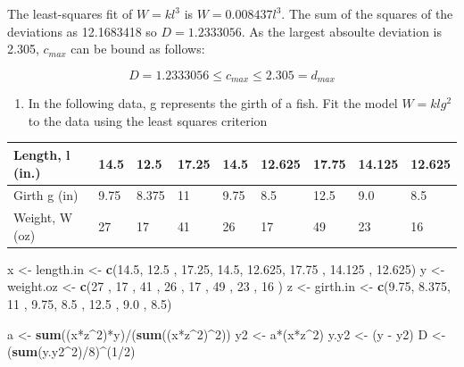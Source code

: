 \documentclass[]{article}
\newenvironment{Shaded}{\begin{snugshade}}{\end{snugshade}}
\newcommand{\KeywordTok}[1]{\textcolor[rgb]{0.13,0.29,0.53}{\textbf{{#1}}}}
\newcommand{\DecValTok}[1]{\textcolor[rgb]{0.00,0.00,0.81}{{#1}}}
\newcommand{\FloatTok}[1]{\textcolor[rgb]{0.00,0.00,0.81}{{#1}}}
\newcommand{\StringTok}[1]{\textcolor[rgb]{0.31,0.60,0.02}{{#1}}}
\newcommand{\NormalTok}[1]{{#1}}
\providecommand{\tightlist}{%
  \setlength{\itemsep}{0pt}\setlength{\parskip}{0pt}}
\begin{document}
The least-squares fit of \(W = kl^3\) is \(W = 0.008437l^3\). The sum of
the squares of the deviations as 12.1683418 so \(D = 1.2333056\). As the
largest absoulte deviation is 2.305, \(c_{max}\) can be bound as
follows:

\[D = 1.2333056 \leq c_{max} \leq 2.305 = d_{max}\]

\begin{enumerate}
\def\labelenumi{\alph{enumi}.}
\setcounter{enumi}{1}
\tightlist
\item
  In the following data, g represents the girth of a fish. Fit the model
  \(W = klg^2\) to the data using the least squares criterion
\end{enumerate}

\begin{table}[!htbp]
\centering
\label{my-label}
\begin{tabular}{l|llllllll}
Length, l (in.) & 14.5 & 12.5 & 17.25 & 14.5 & 12.625 & 17.75 & 14.125 & 12.625 \\ \hline
Girth g (in) & 9.75 & 8.375 & 11 & 9.75 & 8.5 & 12.5 & 9.0 & 8.5 \\ \hline
Weight, W (oz)  & 27   & 17   & 41    & 26   & 17     & 49    & 23     & 16  
\end{tabular}
\end{table}

\begin{Shaded}
\begin{Highlighting}[]
\NormalTok{x <-}\StringTok{ }\NormalTok{length.in <-}\StringTok{ }\KeywordTok{c}\NormalTok{(}\FloatTok{14.5}\NormalTok{, }\FloatTok{12.5} \NormalTok{, }\FloatTok{17.25}\NormalTok{, }\FloatTok{14.5}\NormalTok{, }\FloatTok{12.625}\NormalTok{, }\FloatTok{17.75} \NormalTok{, }\FloatTok{14.125} \NormalTok{, }\FloatTok{12.625}\NormalTok{)}
\NormalTok{y <-}\StringTok{ }\NormalTok{weight.oz <-}\StringTok{ }\KeywordTok{c}\NormalTok{(}\DecValTok{27}  \NormalTok{, }\DecValTok{17}   \NormalTok{, }\DecValTok{41}   \NormalTok{, }\DecValTok{26}  \NormalTok{, }\DecValTok{17}    \NormalTok{, }\DecValTok{49}    \NormalTok{, }\DecValTok{23}     \NormalTok{, }\DecValTok{16} \NormalTok{)}
\NormalTok{z <-}\StringTok{ }\NormalTok{girth.in  <-}\StringTok{ }\KeywordTok{c}\NormalTok{(}\FloatTok{9.75}\NormalTok{, }\FloatTok{8.375}\NormalTok{, }\DecValTok{11}   \NormalTok{, }\FloatTok{9.75}\NormalTok{, }\FloatTok{8.5}   \NormalTok{, }\FloatTok{12.5}  \NormalTok{, }\FloatTok{9.0}    \NormalTok{, }\FloatTok{8.5}\NormalTok{)}

\NormalTok{a <-}\StringTok{ }\KeywordTok{sum}\NormalTok{((x*z^}\DecValTok{2}\NormalTok{)*y)/(}\KeywordTok{sum}\NormalTok{((x*z^}\DecValTok{2}\NormalTok{)^}\DecValTok{2}\NormalTok{))}
\NormalTok{y2 <-}\StringTok{ }\NormalTok{a*(x*z^}\DecValTok{2}\NormalTok{)}
\NormalTok{y.y2 <-}\StringTok{ }\NormalTok{(y -}\StringTok{ }\NormalTok{y2)}
\NormalTok{D <-}\StringTok{ }\NormalTok{(}\KeywordTok{sum}\NormalTok{(y.y2^}\DecValTok{2}\NormalTok{)/}\DecValTok{8}\NormalTok{)^(}\DecValTok{1}\NormalTok{/}\DecValTok{2}\NormalTok{)}
\end{Highlighting}
\end{Shaded}
\end{document}

